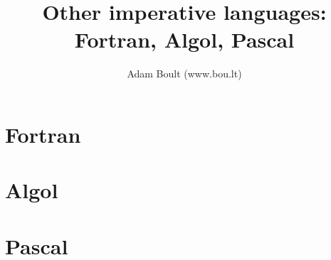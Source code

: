 \documentclass[oneside]{book}
\begin{document}
\author{Adam Boult (www.bou.lt)}
\title{Other imperative languages: Fortran, Algol, Pascal}
\maketitle

\setcounter{tocdepth}{0}
\tableofcontents



\part{Fortran}


\part{Algol}


\part{Pascal}

\end{document}
